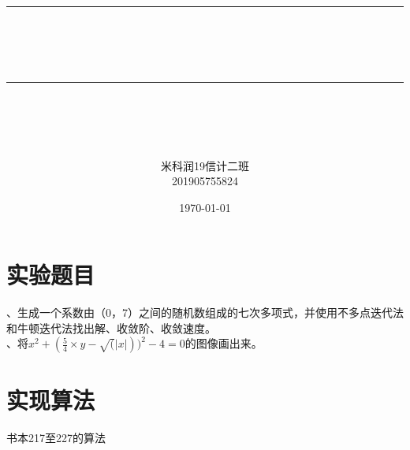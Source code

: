 \documentclass[12pt]{article} %
\newcommand{\horrule}[1]{\rule[0.5ex]{\linewidth}{#1}} 	%
\begin{document}
	
	\title{
		\horrule{0.5pt}\\
		\horrule{1.8pt}\\[20pt]
	}
	\author{米科润\quad 19信计二班\\201905755824}
	\date{\today} %
	
	\begin{titlepage}
		\maketitle
		\vspace{30pt}
		\thispagestyle{empty}
	\end{titlepage}
	
	\tableofcontents
	\thispagestyle{empty}
	
	\newpage
	\setcounter{page}{1}
	
	\section{实验题目}
	、生成一个系数由（0，7）之间的随机数组成的七次多项式，并使用不多点迭代法和牛顿迭代法找出解、收敛阶、收敛速度。\\
	、将$x^2+(\frac{5}{4}\times y- \sqrt(\left| x\right|))^2-4=0$的图像画出来。
	
	\section{实现算法}
	书本217至227的算法
	
	
	
\end{document}
